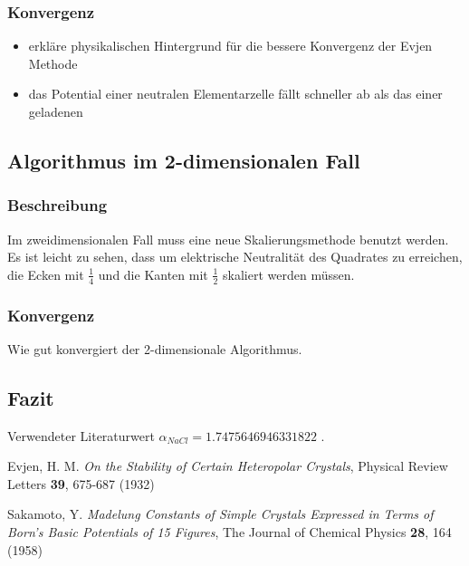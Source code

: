 \documentclass[10pt,a4paper]{article}
\begin{document}
\subsubsection{Konvergenz}

\begin{itemize}
\item erkläre physikalischen Hintergrund für die bessere Konvergenz der Evjen Methode
\item das Potential einer neutralen Elementarzelle fällt schneller ab als das einer geladenen
\end{itemize}

\subsection{Algorithmus im 2-dimensionalen Fall}
\subsubsection{Beschreibung}
Im zweidimensionalen Fall muss eine neue Skalierungsmethode benutzt werden. Es ist leicht zu sehen, dass um elektrische Neutralität des Quadrates zu erreichen, die Ecken mit $\frac{1}{4}$ und die Kanten mit $\frac{1}{2}$ skaliert werden müssen.

\subsubsection{Konvergenz}

Wie gut konvergiert der 2-dimensionale Algorithmus.

\subsection{Fazit}

Verwendeter Literaturwert $\alpha_{NaCl} = 1.7475646946331822$ \cite{Sakamoto} .


\begin{thebibliography}{9}

Evjen, H. M.
\emph{On the Stability of Certain Heteropolar Crystals},
Physical Review Letters \textbf{39},
675-687 (1932)

Sakamoto, Y.
\emph{Madelung Constants of Simple Crystals Expressed in Terms of Born's Basic Potentials of 15 Figures},
The Journal of Chemical Physics \textbf{28},
164 (1958)

\end{thebibliography}
\end{document}
